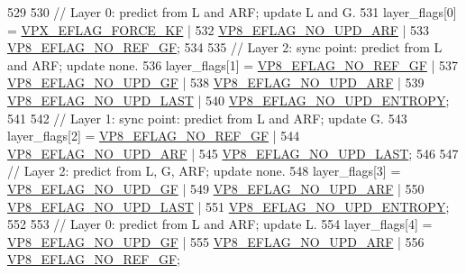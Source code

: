 \begin{DoxyCodeInclude}
{{{{{{{{{{{{{{{529 
530         \textcolor{comment}{// Layer 0: predict from L and ARF; update L and G.}
531         layer\_flags[0] =  \hyperlink{group__encoder_ga4c4f4e3cbb5225d2c6c050e2d1e948fa}{VPX\_EFLAG\_FORCE\_KF}  |
532                           \hyperlink{group__vp8__encoder_ga1cff46a5287e73a620660030d40b9e6c}{VP8\_EFLAG\_NO\_UPD\_ARF} |
533                           \hyperlink{group__vp8__encoder_gabb5e95343a2738abef44eca13059da33}{VP8\_EFLAG\_NO\_REF\_GF};
534 
535         \textcolor{comment}{// Layer 2: sync point: predict from L and ARF; update none.}
536         layer\_flags[1] = \hyperlink{group__vp8__encoder_gabb5e95343a2738abef44eca13059da33}{VP8\_EFLAG\_NO\_REF\_GF} |
537                          \hyperlink{group__vp8__encoder_gab01d066c5236457d345ce1cab4c41d6b}{VP8\_EFLAG\_NO\_UPD\_GF} |
538                          \hyperlink{group__vp8__encoder_ga1cff46a5287e73a620660030d40b9e6c}{VP8\_EFLAG\_NO\_UPD\_ARF} |
539                          \hyperlink{group__vp8__encoder_ga602edb6b02a89cb2db7a16d6dffba583}{VP8\_EFLAG\_NO\_UPD\_LAST} |
540                          \hyperlink{group__vp8__encoder_ga5b91ad179910d4efc23aef66c7b2148b}{VP8\_EFLAG\_NO\_UPD\_ENTROPY};
541 
542         \textcolor{comment}{// Layer 1: sync point: predict from L and ARF; update G.}
543         layer\_flags[2] = \hyperlink{group__vp8__encoder_gabb5e95343a2738abef44eca13059da33}{VP8\_EFLAG\_NO\_REF\_GF} |
544                          \hyperlink{group__vp8__encoder_ga1cff46a5287e73a620660030d40b9e6c}{VP8\_EFLAG\_NO\_UPD\_ARF} |
545                          \hyperlink{group__vp8__encoder_ga602edb6b02a89cb2db7a16d6dffba583}{VP8\_EFLAG\_NO\_UPD\_LAST};
546 
547         \textcolor{comment}{// Layer 2: predict from L, G, ARF; update none.}
548         layer\_flags[3] = \hyperlink{group__vp8__encoder_gab01d066c5236457d345ce1cab4c41d6b}{VP8\_EFLAG\_NO\_UPD\_GF} |
549                          \hyperlink{group__vp8__encoder_ga1cff46a5287e73a620660030d40b9e6c}{VP8\_EFLAG\_NO\_UPD\_ARF} |
550                          \hyperlink{group__vp8__encoder_ga602edb6b02a89cb2db7a16d6dffba583}{VP8\_EFLAG\_NO\_UPD\_LAST} |
551                          \hyperlink{group__vp8__encoder_ga5b91ad179910d4efc23aef66c7b2148b}{VP8\_EFLAG\_NO\_UPD\_ENTROPY};
552 
553         \textcolor{comment}{// Layer 0: predict from L and ARF; update L.}
554         layer\_flags[4] = \hyperlink{group__vp8__encoder_gab01d066c5236457d345ce1cab4c41d6b}{VP8\_EFLAG\_NO\_UPD\_GF} |
555                          \hyperlink{group__vp8__encoder_ga1cff46a5287e73a620660030d40b9e6c}{VP8\_EFLAG\_NO\_UPD\_ARF} |
556                          \hyperlink{group__vp8__encoder_gabb5e95343a2738abef44eca13059da33}{VP8\_EFLAG\_NO\_REF\_GF};
}}}}}}}}}}}}}}}
\end{DoxyCodeInclude}
